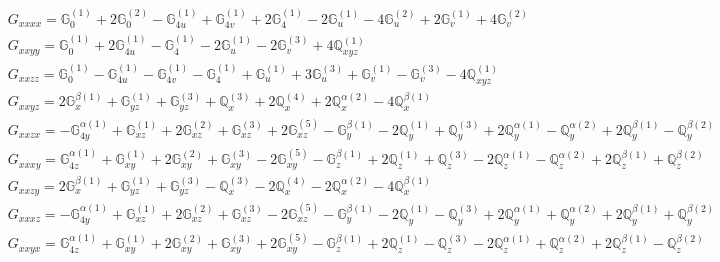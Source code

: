\documentclass[fleqn,8pt,landscape]{jsarticle}
\begin{document}
\begin{align*}
& G_{xxxx} = \mathbb{G}_{0}^{(1)} + 2 \mathbb{G}_{0}^{(2)} - \mathbb{G}_{4u}^{(1)} + \mathbb{G}_{4v}^{(1)} + 2 \mathbb{G}_{4}^{(1)} - 2 \mathbb{G}_{u}^{(1)} - 4 \mathbb{G}_{u}^{(2)} + 2 \mathbb{G}_{v}^{(1)} + 4 \mathbb{G}_{v}^{(2)} \\
& G_{xxyy} = \mathbb{G}_{0}^{(1)} + 2 \mathbb{G}_{4u}^{(1)} - \mathbb{G}_{4}^{(1)} - 2 \mathbb{G}_{u}^{(1)} - 2 \mathbb{G}_{v}^{(3)} + 4 \mathbb{Q}_{xyz}^{(1)} \\
& G_{xxzz} = \mathbb{G}_{0}^{(1)} - \mathbb{G}_{4u}^{(1)} - \mathbb{G}_{4v}^{(1)} - \mathbb{G}_{4}^{(1)} + \mathbb{G}_{u}^{(1)} + 3 \mathbb{G}_{u}^{(3)} + \mathbb{G}_{v}^{(1)} - \mathbb{G}_{v}^{(3)} - 4 \mathbb{Q}_{xyz}^{(1)} \\
& G_{xxyz} = 2 \mathbb{G}_{x}^{\beta(1)} + \mathbb{G}_{yz}^{(1)} + \mathbb{G}_{yz}^{(3)} + \mathbb{Q}_{x}^{(3)} + 2 \mathbb{Q}_{x}^{(4)} + 2 \mathbb{Q}_{x}^{\alpha(2)} - 4 \mathbb{Q}_{x}^{\beta(1)} \\
& G_{xxzx} = - \mathbb{G}_{4y}^{\alpha(1)} + \mathbb{G}_{xz}^{(1)} + 2 \mathbb{G}_{xz}^{(2)} + \mathbb{G}_{xz}^{(3)} + 2 \mathbb{G}_{xz}^{(5)} - \mathbb{G}_{y}^{\beta(1)} - 2 \mathbb{Q}_{y}^{(1)} + \mathbb{Q}_{y}^{(3)} + 2 \mathbb{Q}_{y}^{\alpha(1)} - \mathbb{Q}_{y}^{\alpha(2)} + 2 \mathbb{Q}_{y}^{\beta(1)} - \mathbb{Q}_{y}^{\beta(2)} \\
& G_{xxxy} = \mathbb{G}_{4z}^{\alpha(1)} + \mathbb{G}_{xy}^{(1)} + 2 \mathbb{G}_{xy}^{(2)} + \mathbb{G}_{xy}^{(3)} - 2 \mathbb{G}_{xy}^{(5)} - \mathbb{G}_{z}^{\beta(1)} + 2 \mathbb{Q}_{z}^{(1)} + \mathbb{Q}_{z}^{(3)} - 2 \mathbb{Q}_{z}^{\alpha(1)} - \mathbb{Q}_{z}^{\alpha(2)} + 2 \mathbb{Q}_{z}^{\beta(1)} + \mathbb{Q}_{z}^{\beta(2)} \\
& G_{xxzy} = 2 \mathbb{G}_{x}^{\beta(1)} + \mathbb{G}_{yz}^{(1)} + \mathbb{G}_{yz}^{(3)} - \mathbb{Q}_{x}^{(3)} - 2 \mathbb{Q}_{x}^{(4)} - 2 \mathbb{Q}_{x}^{\alpha(2)} - 4 \mathbb{Q}_{x}^{\beta(1)} \\
& G_{xxxz} = - \mathbb{G}_{4y}^{\alpha(1)} + \mathbb{G}_{xz}^{(1)} + 2 \mathbb{G}_{xz}^{(2)} + \mathbb{G}_{xz}^{(3)} - 2 \mathbb{G}_{xz}^{(5)} - \mathbb{G}_{y}^{\beta(1)} - 2 \mathbb{Q}_{y}^{(1)} - \mathbb{Q}_{y}^{(3)} + 2 \mathbb{Q}_{y}^{\alpha(1)} + \mathbb{Q}_{y}^{\alpha(2)} + 2 \mathbb{Q}_{y}^{\beta(1)} + \mathbb{Q}_{y}^{\beta(2)} \\
& G_{xxyx} = \mathbb{G}_{4z}^{\alpha(1)} + \mathbb{G}_{xy}^{(1)} + 2 \mathbb{G}_{xy}^{(2)} + \mathbb{G}_{xy}^{(3)} + 2 \mathbb{G}_{xy}^{(5)} - \mathbb{G}_{z}^{\beta(1)} + 2 \mathbb{Q}_{z}^{(1)} - \mathbb{Q}_{z}^{(3)} - 2 \mathbb{Q}_{z}^{\alpha(1)} + \mathbb{Q}_{z}^{\alpha(2)} + 2 \mathbb{Q}_{z}^{\beta(1)} - \mathbb{Q}_{z}^{\beta(2)} \\

\end{align*}
\end{document}
